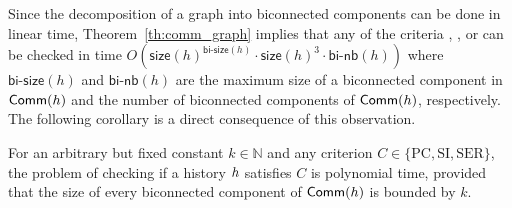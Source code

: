 
Since the decomposition of a graph into biconnected components can be done in linear time, Theorem~\ref{th:comm_graph} implies that any of the criteria , , or  can be checked in time $O(\mathsf{size}(h)^{\mathsf{bi\text{-}size}(h)}\cdot \mathsf{size}(h)^3\cdot \mathsf{bi\text{-}nb}(h))$ where $\mathsf{bi\text{-}size}(h)$ and $\mathsf{bi\text{-}nb}(h)$ are the maximum size of a biconnected component in $\mathsf{Comm}({h})$ and the number of biconnected components of $\mathsf{Comm}({h})$, respectively. The following corollary is a direct consequence of this observation.

\begin{corollary}
For an arbitrary but fixed constant $k\in\mathbb{N}$ and any criterion $C\in\{\text{PC},\text{SI},\text{SER}\}$, the problem of checking if a history ${h}$ satisfies $C$ is polynomial time, provided that the size of every biconnected component of $\mathsf{Comm}({h})$ is bounded by $k$.
\end{corollary}

